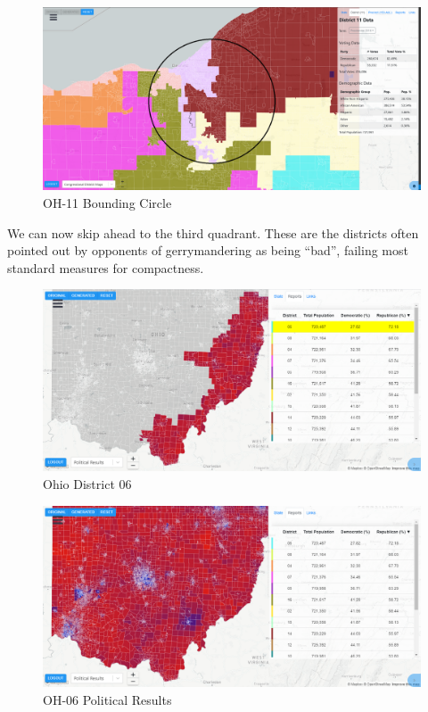 \documentclass[letterpaper]{article}
\begin{document}
\begin{figure}[H]
	\includegraphics[width=\linewidth]{./figures/OH-11-BoundingCircle.png}
	\caption{OH-11 Bounding Circle}
	\label{fig:oh11boundingCircle}
\end{figure}



We can now skip ahead to the third quadrant. These are the districts often pointed out by opponents of gerrymandering as being “bad”, failing most standard measures for compactness.

\begin{figure}[H]
	\includegraphics[width=\linewidth]{./figures/OH-06.png}
	\caption{Ohio District 06}
	\label{fig:oh06border}
\end{figure}

\begin{figure}[H]
	\includegraphics[width=\linewidth]{./figures/OH-06-SurroundingArea.png}
	\caption{OH-06 Political Results}
	\label{fig:oh06political}
\end{figure}
\end{document}
